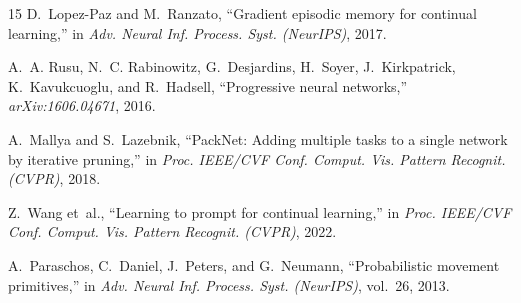 \documentclass[10pt,twocolumn]{article}
\begin{document}
\begin{thebibliography}{15}
D.~Lopez-Paz and M.~Ranzato, ``Gradient episodic memory for continual learning,'' in \emph{Adv. Neural Inf. Process. Syst. (NeurIPS)}, 2017.

A.~A. Rusu, N.~C. Rabinowitz, G.~Desjardins, H.~Soyer, J.~Kirkpatrick, K.~Kavukcuoglu, and R.~Hadsell, ``Progressive neural networks,'' \emph{arXiv:1606.04671}, 2016.

A.~Mallya and S.~Lazebnik, ``PackNet: Adding multiple tasks to a single network by iterative pruning,'' in \emph{Proc. IEEE/CVF Conf. Comput. Vis. Pattern Recognit. (CVPR)}, 2018.

Z.~Wang et~al., ``Learning to prompt for continual learning,'' in \emph{Proc. IEEE/CVF Conf. Comput. Vis. Pattern Recognit. (CVPR)}, 2022.

A.~Paraschos, C.~Daniel, J.~Peters, and G.~Neumann, ``Probabilistic movement primitives,'' in \emph{Adv. Neural Inf. Process. Syst. (NeurIPS)}, vol.~26, 2013.

\end{thebibliography}
\end{document}
